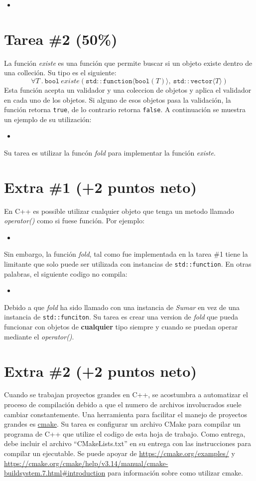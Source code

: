 \documentclass{article}
\newcommand{\perlscript}[2]{
\begin{itemize}
\item[]
\end{itemize}
}
\begin{document}
\perlscript{fold.cc}{}

\section*{Tarea \#2 (50\%)}

La funci\'on \emph{existe} es una funci\'on que permite buscar si un objeto existe dentro de una
colleci\'on. Su tipo es el siguiente:
\[
        \forall T\ .\ \mathtt{bool}\ existe(\mathtt{std::function}\langle \mathtt{bool}(T)\rangle,\ \mathtt{std::vector}\langle T \rangle)
\]
Esta funci\'on acepta un validador y una coleccion de objetos y aplica el validador en cada uno
de los objetos. Si alguno de esos objetos pasa la validaci\'on, la funci\'on retorna \texttt{true},
de lo contrario retorna \texttt{false}. A continuaci\'on se muestra un ejemplo de su utilizaci\'on:
\perlscript{find.cc}{}

Su tarea es utilizar la func\'on \emph{fold} para implementar la funci\'on \emph{existe}.

\section*{Extra \#1 (+2 puntos neto)}

En C++ es possible utilizar cualquier objeto que tenga un metodo llamado \emph{operator()} como
si fuese funci\'on. Por ejemplo:
\perlscript{operator.cc}{}

Sin embargo, la funci\'on \emph{fold}, tal como fue implementada en la tarea \#1 tiene la limitante
que solo puede ser utilizada con instancias de \texttt{std::function}. En otras palabras, el siguiente
codigo no compila:
\perlscript{mal.cc}{}

Debido a que \emph{fold} ha sido llamado con una instancia de \emph{Sumar} en vez de una instancia
de \texttt{std::funciton}. Su tarea es crear una version de \emph{fold} que pueda funcionar con
objetos de {\bf cualquier} tipo siempre y cuando se puedan operar mediante el \emph{operator()}. 

\section*{Extra \#2 (+2 puntos neto)}

Cuando se trabajan proyectos grandes en C++, se acostumbra a automatizar el proceso de compilaci\'on
debido a que el numero de archivos involucrados suele cambiar constantemente. Una herramienta
para facilitar el manejo de proyectos grandes es \href{https://cmake.org}{cmake}. Su tarea es
configurar un archivo CMake para compilar un programa de C++ que utilize el codigo de esta
hoja de trabajo. Como entrega, debe incluir el archivo ``CMakeLists.txt'' en su entrega con
las instrucciones para compilar un ejecutable. Se puede apoyar de \url{https://cmake.org/examples/}
y \url{https://cmake.org/cmake/help/v3.14/manual/cmake-buildsystem.7.html#introduction} para
informaci\'on sobre como utilizar cmake.
\end{document}
